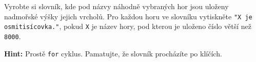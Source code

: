 \question[50]
Vyrobte si slovník, kde pod názvy náhodně vybraných hor jsou uloženy nadmořské
výšky jejich vrcholů. Pro každou horu ve slovníku vytiskněte \texttt{"X je
osmitisícovka."}, pokud \texttt{X} je název hory, pod kterou je uloženo číslo
větší než \texttt{8000}.

\textbf{Hint:} Prostě \texttt{for} cyklus. Pamatujte, že slovník procházíte po
klíčích.